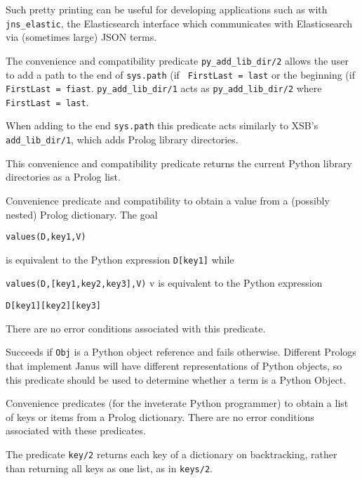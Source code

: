 \begin{description}
Such pretty printing can be useful for developing applications such as
with {\tt jns\_elastic}, the \janus{} Elasticsearch interface which
communicates with Elasticsearch via (sometimes large) JSON terms.

%
The convenience and compatibility predicate {\tt py\_add\_lib\_dir/2}
allows the user to add a path to the end of {\tt sys.path} (if {\tt
  FirstLast = last} or the beginning (if {\tt FirstLast = fiast}.
{\tt py\_add\_lib\_dir/1} acts as {\tt py\_add\_lib\_dir/2} where {\tt
  FirstLast = last}.

When adding to the end {\tt sys.path} this predicate acts similarly to
XSB's {\tt add\_lib\_dir/1}, which adds Prolog library directories.

%
This convenience and compatibility predicate returns the current Python library
directories as a Prolog list.

%
  Convenience predicate and compatibility to obtain a value from a
  (possibly nested) Prolog dictionary.  The goal

  {\tt values(D,key1,V)}

\noindent
  is equivalent to the
  Python expression {\tt D[key1]} while

  {\tt values(D,[key1,key2,key3],V)}
v
\noindent
is equivalent to the Python expression

{\tt D[key1][key2][key3]}

There are no error conditions associated with this predicate.

%
Succeeds if {\tt Obj} is a Python object reference and fails
otherwise.  Different Prologs that implement Janus will have different
representations of Python objects, so this predicate should be used
to determine whether a term is a Python Object.

%
Convenience predicates (for the inveterate Python programmer) to
obtain a list of keys or items from a Prolog dictionary.  There are no
error conditions associated with these predicates.

The predicate {\tt key/2} returns each key of a dictionary on
backtracking, rather than returning all keys as one list, as in {\tt keys/2}.


\end{description}
